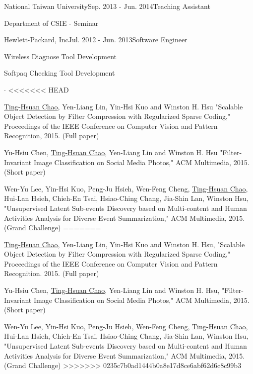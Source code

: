 \documentclass{joel_cv}
\begin{document}
\begin{sectionContentNormal}{National Taiwan University}{Sep. 2013 - Jun. 2014}{Teaching Assistant}
	\item Department of CSIE - Seminar
\end{sectionContentNormal}

\begin{sectionContentNormal}{Hewlett-Packard, Inc}{Jul. 2012 - Jun. 2013}{Software Engineer}
	\item Wireless Diagnose Tool Development
	\item Softpaq Checking Tool Development
\end{sectionContentNormal}

%
%

\begin{sectionItemize}{$\cdot$}
<<<<<<< HEAD
	\item \underline{Ting-Hsuan Chao}, Yen-Liang Lin, Yin-Hsi Kuo and Winston H. Hsu "Scalable Object Detection by Filter Compression with Regularized Sparse Coding," Proceedings of the IEEE Conference on Computer Vision and Pattern Recognition, 2015. (Full paper)
	\item Yu-Hsiu Chen, \underline{Ting-Hsuan Chao},  Yen-Liang Lin and Winston H. Hsu "Filter-Invariant Image Classification on Social Media Photos," ACM Multimedia, 2015. (Short paper)
	\item Wen-Yu Lee, Yin-Hsi Kuo, Peng-Ju Hsieh, Wen-Feng Cheng, \underline{Ting-Hsuan Chao}, Hui-Lan Hsieh, Chieh-En Tsai, Hsiao-Ching Chang, Jia-Shin Lan, Winston Hsu, "Unsupervised Latent Sub-events Discovery based on Multi-content and Human Activities Analysis for Diverse Event Summarization,"  ACM Multimedia, 2015. (Grand Challenge)
=======
	\item \underline{Ting-Hsuan Chao}, Yen-Liang Lin, Yin-Hsi Kuo and Winston H. Hsu, "Scalable Object Detection by Filter Compression with Regularized Sparse Coding," Proceedings of the IEEE Conference on Computer Vision and Pattern Recognition. 2015. (Full paper)
	\item Yu-Hsiu Chen, \underline{Ting-Hsuan Chao},  Yen-Liang Lin and Winston H. Hsu, "Filter-Invariant Image Classification on Social Media Photos," ACM Multimedia, 2015. (Short paper)
	\item Wen-Yu Lee, Yin-Hsi Kuo, Peng-Ju Hsieh, Wen-Feng Cheng, \underline{Ting-Hsuan Chao}, Hui-Lan Hsieh, Chieh-En Tsai, Hsiao-Ching Chang, Jia-Shin Lan, Winston Hsu, "Unsupervised Latent Sub-events Discovery based on Multi-content and Human Activities Analysis for Diverse Event Summarization," ACM Multimedia, 2015. (Grand Challenge)
>>>>>>> 0235c7b0ad1444b0a8e17d8ce6abf62d6c8c99b3
\end{sectionItemize}
\end{document}
